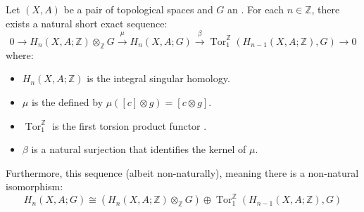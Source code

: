 \begin{theorem} \label{theorem:universal_coefficient_theorem_for_singular_homology_of_topological_spaces_with_coefficients_in_abelian_groups}
Let $(X, A)$ be a pair of topological spaces and $G$ an . For each $n \in \mathbb{Z}$, there exists a natural short exact sequence:
$$ 0 \to H_n(X, A; \mathbb{Z}) \otimes_{\mathbb{Z}} G \xrightarrow{\mu} H_n(X, A; G) \xrightarrow{\beta} \operatorname{Tor}_1^{\mathbb{Z}}(H_{n-1}(X, A; \mathbb{Z}), G) \to 0 $$
where:
\begin{itemize}
    \item $H_n(X, A; \mathbb{Z})$ is the integral singular homology.
    \item $\mu$ is the  defined by $\mu([c] \otimes g) = [c \otimes g]$.
    \item $\operatorname{Tor}_1^{\mathbb{Z}}$ is the first torsion product functor .
    \item $\beta$ is a natural surjection that identifies the kernel of $\mu$.
\end{itemize}
Furthermore, this sequence  (albeit non-naturally), meaning there is a non-natural isomorphism:
$$ H_n(X, A; G) \cong (H_n(X, A; \mathbb{Z}) \otimes_{\mathbb{Z}} G) \oplus \operatorname{Tor}_1^{\mathbb{Z}}(H_{n-1}(X, A; \mathbb{Z}), G) $$
\end{theorem}